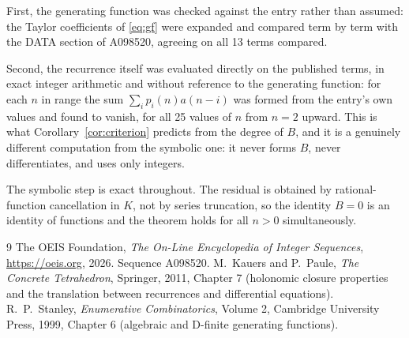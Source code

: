 \documentclass[11pt,a4paper]{article}
\theoremstyle{plain}
\theoremstyle{definition}
\begin{document}
First, the generating function was checked against the entry rather than assumed: the
Taylor coefficients of \eqref{eq:gf} were expanded and compared term by term with the DATA
section of A098520, agreeing on all 13 terms compared.

Second, the recurrence itself was evaluated directly on the published terms, in exact
integer arithmetic and without reference to the generating function: for each $n$ in range
the sum $\sum_{i}p_{i}(n)a(n-i)$ was formed from the entry's own values and found to
vanish, for all 25 values of $n$ from $n=2$ upward. This is what
Corollary~\ref{cor:criterion} predicts from the degree of $B$, and it is a genuinely
different computation from the symbolic one: it never forms $B$, never differentiates, and
uses only integers.

The symbolic step is exact throughout. The residual is obtained by rational-function
cancellation in $K$, not by series truncation, so the identity $B=0$ is an
identity of functions and the theorem holds for all $n>0$ simultaneously.

\begin{thebibliography}{9}
 The OEIS Foundation, \emph{The On-Line Encyclopedia of Integer Sequences},
\url{https://oeis.org}, 2026. Sequence A098520.
 M.~Kauers and P.~Paule, \emph{The Concrete Tetrahedron}, Springer, 2011,
Chapter 7 (holonomic closure properties and the translation between recurrences and
differential equations).
 R.~P.~Stanley, \emph{Enumerative Combinatorics}, Volume 2, Cambridge
University Press, 1999, Chapter 6 (algebraic and D-finite generating functions).
\end{thebibliography}
\end{document}
